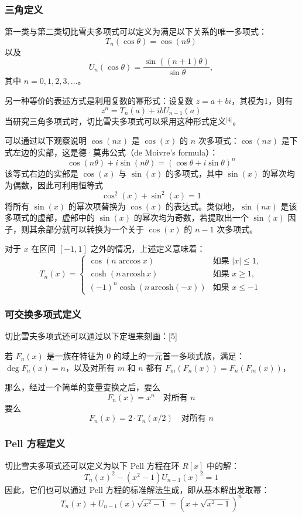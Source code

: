 \subsubsection{三角定义}
第一类与第二类切比雪夫多项式可以定义为满足以下关系的唯一多项式：
$$
T_n(\cos \theta) = \cos(n\theta)~
$$
以及
$$
U_n(\cos \theta) = \frac{\sin((n+1)\theta)}{\sin \theta},~
$$
其中 $n = 0, 1, 2, 3, \ldots$。

另一种等价的表述方式是利用复数的幂形式：设复数 $z = a + bi$，其模为1，则有
$$
z^n = T_n(a) + i b U_{n-1}(a)~
$$
当研究三角多项式时，切比雪夫多项式可以采用这种形式定义\(^\text{[4]}\)。

可以通过以下观察说明 $\cos(nx)$ 是 $\cos(x)$ 的 $n$ 次多项式：$\cos(nx)$ 是下式左边的实部，这是德·莫弗公式（de Moivre’s formula）：
$$
\cos(n\theta) + i\sin(n\theta) = (\cos \theta + i \sin \theta)^n~
$$
该等式右边的实部是 $\cos(x)$ 与 $\sin(x)$ 的多项式，其中 $\sin(x)$ 的幂次均为偶数，因此可利用恒等式
$$
\cos^2(x) + \sin^2(x) = 1~
$$
将所有 $\sin(x)$ 的幂次项替换为 $\cos(x)$ 的表达式。类似地，$\sin(nx)$ 是该多项式的虚部，虚部中的 $\sin(x)$ 的幂次均为奇数，若提取出一个 $\sin(x)$ 因子，则其余部分就可以转换为一个关于 $\cos(x)$ 的 $n-1$ 次多项式。

对于 $x$ 在区间 $[-1, 1]$ 之外的情况，上述定义意味着：
$$
T_n(x) =
\begin{cases}
\cos(n \arccos x) & \text{如果 } |x| \leq 1, \\
\cosh(n \, \mathrm{arcosh}\, x) & \text{如果 } x \geq 1, \\
(-1)^n \cosh(n \, \mathrm{arcosh}(-x)) & \text{如果 } x \leq -1
\end{cases}~
$$
\subsubsection{可交换多项式定义}
切比雪夫多项式还可以通过以下定理来刻画：[5]

若 $F_n(x)$ 是一族在特征为 0 的域上的一元首一多项式族，满足：$\deg F_n(x) = n$，以及对所有 $m$ 和 $n$ 都有 $F_m(F_n(x)) = F_n(F_m(x))$，

那么，经过一个简单的变量变换之后，要么
$$
F_n(x) = x^n \quad \text{对所有 } n~
$$
要么
$$
F_n(x) = 2 \cdot T_n(x/2) \quad \text{对所有 } n~
$$
\subsubsection{Pell 方程定义}
切比雪夫多项式还可以定义为以下 Pell 方程在环 $R[x]$ 中的解：
$$
T_n(x)^2 - (x^2 - 1) U_{n-1}(x)^2 = 1~
$$
因此，它们也可以通过 Pell 方程的标准解法生成，即从基本解出发取幂：
$$
T_n(x) + U_{n-1}(x) \sqrt{x^2 - 1} = \left(x + \sqrt{x^2 - 1}\right)^n~
$$
